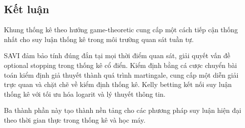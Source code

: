 \subsection{Kết luận}

Khung thống kê theo hướng game-theoretic cung cấp một cách tiếp cận thống nhất
cho suy luận thống kê trong môi trường quan sát tuần tự.

SAVI đảm bảo tính đúng đắn tại mọi thời điểm quan sát, giải quyết vấn đề
optional stopping trong thống kê cổ điển. Kiểm định bằng cá cược chuyển bài
toán kiểm định giả thuyết thành quá trình martingale, cung cấp một diễn giải
trực quan và chặt chẽ về kiểm định thống kê. Kelly betting kết nối suy luận
thống kê với tối ưu hóa logarit và lý thuyết thông tin.

Ba thành phần này tạo thành nền tảng cho các phương pháp suy luận hiện đại theo
thời gian thực trong thống kê và học máy.
